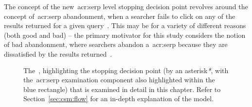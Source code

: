 The concept of the new~\gls{acr:serp} level stopping decision point revolves around the concept of~\gls{acr:serp} abandonment, when a searcher fails to click on any of the results returned for a given query~\citep{diriye2012abandonment, hassan2013serp_abandonment}. This may be for a variety of different reasons (both good and bad) -- the primary motivator for this study considers the notion of bad abandonment, where searchers abandon a~\gls{acr:serp} because they are dissatisfied by the results returned~\citep{hassan2013serp_abandonment}.

\begin{figure}[t!]
    \centering
    \caption[The~\gls{acr:csm} and~\gls{acr:serp} stopping point]{The~, highlighting the stopping decision point (by an asterisk\emph{*}, with the~\gls{acr:serp} examination component also highlighted within the blue rectangle) that is examined in detail in this chapter. Refer to Section~\ref{sec:csm:flow} for an in-depth explanation of the model.}
    \label{fig:csm_ch9}
\end{figure}

